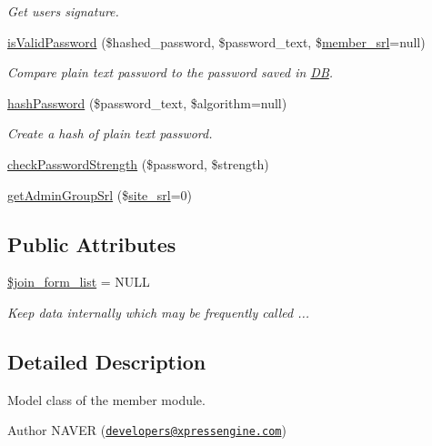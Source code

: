 \begin{DoxyCompactItemize}
\begin{DoxyCompactList}\small\item\em Get user\textquotesingle{}s signature. \end{DoxyCompactList}\item 
\hyperlink{classmemberModel_a5d2727323d47e4304998311424bb4091}{is\+Valid\+Password} (\$hashed\+\_\+password, \$password\+\_\+text, \$\hyperlink{ko_8install_8php_aa61f9e08f0fe505094d26f8143f30bbd}{member\+\_\+srl}=null)
\begin{DoxyCompactList}\small\item\em Compare plain text password to the password saved in \hyperlink{classDB}{D\+B}. \end{DoxyCompactList}\item 
\hyperlink{classmemberModel_a0183c4c53c2eadc045ba27d82b94412a}{hash\+Password} (\$password\+\_\+text, \$algorithm=null)
\begin{DoxyCompactList}\small\item\em Create a hash of plain text password. \end{DoxyCompactList}\item 
\hyperlink{classmemberModel_a5970b2dcba76f9fc910cc3df7de19ac7}{check\+Password\+Strength} (\$password, \$strength)
\item 
\hyperlink{classmemberModel_ad8c1aafe9a4f461404b596ff6ad3e2ed}{get\+Admin\+Group\+Srl} (\$\hyperlink{ko_8install_8php_a8b1406b4ad1048041558dce6bfe89004}{site\+\_\+srl}=0)
\end{DoxyCompactItemize}
\subsection*{Public Attributes}
\begin{DoxyCompactItemize}
\item 
\hyperlink{classmemberModel_aa9b942e17ed74955c8700dd74d75d2b2}{\$join\+\_\+form\+\_\+list} = N\+U\+L\+L
\begin{DoxyCompactList}\small\item\em Keep data internally which may be frequently called ... \end{DoxyCompactList}\end{DoxyCompactItemize}


\subsection{Detailed Description}
Model class of the member module. 

\begin{DoxyAuthor}{Author}
N\+A\+V\+E\+R (\href{mailto:developers@xpressengine.com}{\tt developers@xpressengine.\+com}) 
\end{DoxyAuthor}


